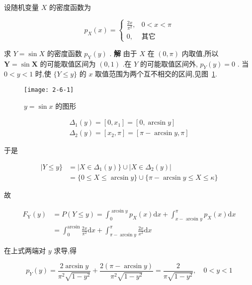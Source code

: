 \begin{example}
	设随机变量 $ X $ 的密度函数为
	
	\[
	p_{X}(x)=\left\{\begin{array}{ll}
	{\frac{2 x}{\pi^{2}},} & {0<x<\pi} \\ 
	{0,} & {\text{其它}}
	\end{array}\right.
	\]
	
	求 $ Y=\sin X $ 的密度函数 $ p_{\mathrm{Y}}(y) $ .
	\textbf{解} 由于 $ X $ 在 $ (0, \pi) $ 内取值,所以 $ \mathbf{Y}=\sin \boldsymbol{X} $ 的可能取值区间为 $ (0,1) $ .在 $ Y $ 的可能取值区间外, $ p_{Y}(y)=0 $ .
	当 $ 0<y<1 $ 时,使 $ \{ Y \leqslant y \} $ 的 $ x $ 取值范围为两个互不相交的区间,见图~\ref{fig:2-6-1}.
	
	\begin{figure}
		\centering
		\texttt{[image: 2-6-1]}
		\caption{ $ y=\sin x $ 的图形}
		\label{fig:2-6-1}
	\end{figure}
	
	\[
	\begin{array}{l}{\Delta_{1}(y)=\left[0, x_{1}\right]=[0, \arcsin y]} \\ {\Delta_{2}(y)=\left[x_{2}, \pi\right]=[\pi-\arcsin y, \pi]}\end{array}
	\]
	
	于是
	
	\[
	\begin{aligned} | Y \leqslant y \} &=| X \in \Delta_{1}(y) \} \cup\left|X \in \Delta_{2}(y)\right| \\ &=\{0 \leqslant X \leqslant \arcsin y\} \cup\{\pi-\arcsin y \leqslant X \leqslant \kappa\} \end{aligned}
	\]
	
	故
	
	\[
	\begin{array}{ll}
	{F_{\mathrm{Y}}(y)} & {=P(Y \leqslant y)=\int_{0}^{\arcsin y} p_{X}(x) \mathrm{d} x+\int_{x-\text { arcsin } y}^{\pi} p_{X}(x) \mathrm{d} x} \\ 
	{} & {=\int_{0}^{\arcsin } \frac{2 x}{\pi^{2}} \mathrm{d} x+\int_{\pi-\arcsin y}^{\pi} \frac{2 x}{x^{2}} \mathrm{d} x}
	\end{array}
	\]
	
	在上式两端对 $ y $ 求导,得
	
	\[
	p_{Y}(y)=\frac{2 \arcsin y}{\pi^{2} \sqrt{1-y^{2}}}+\frac{2(\pi-\arcsin y)}{\pi^{2} \sqrt{1-y^{2}}}=\frac{2}{\pi \sqrt{1-y^{2}}}, \quad 0<y<1
	\]
\end{example}

